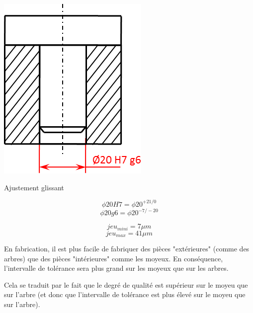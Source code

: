 \documentclass[11pt,oneside]{article}
\begin{document}
\begin{exemple}
\begin{minipage}[c]{.3\linewidth}
\end{minipage}\hfill
\begin{minipage}[c]{.3\linewidth}
\begin{center}
\includegraphics[width=.9\textwidth]{png/glissant}

Ajustement glissant
\end{center}

$$\phi 20 H7 = \phi 20^{+21/0} $$
$$\phi 20 g6 = \phi 20^{-7/-20}$$

$$jeu_{mini}= 7\mu m$$
$$jeu_{max}=41\mu m$$
\end{minipage}
\end{exemple}

\begin{rem}
En fabrication, il est plus facile de fabriquer des pièces "extérieures" (comme des arbres) que des pièces "intérieures" comme les moyeux. En conséquence, l'intervalle de tolérance sera plus grand sur les moyeux que sur les arbres. 

Cela se traduit par le fait que le degré de qualité est supérieur sur le moyeu que sur l'arbre (et donc que l'intervalle de tolérance est plus élevé sur le moyeu que sur l'arbre).
\end{rem}
\end{document}
